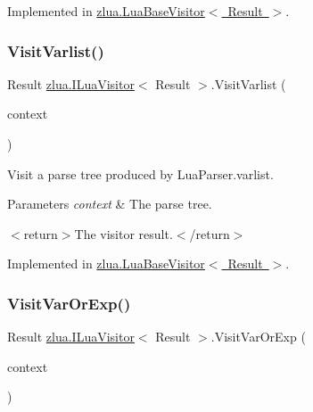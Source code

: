 Implemented in \mbox{\hyperlink{classzlua_1_1_lua_base_visitor_afdd236b54f45e1667274018d2ace456d}{zlua.\+Lua\+Base\+Visitor$<$ Result $>$}}.

\mbox{\label{interfacezlua_1_1_i_lua_visitor_aadf416d9a85416107f278f794421819e}} 
\subsubsection{\texorpdfstring{Visit\+Varlist()}{VisitVarlist()}}
{\footnotesize\ttfamily Result \mbox{\hyperlink{interfacezlua_1_1_i_lua_visitor}{zlua.\+I\+Lua\+Visitor}}$<$ Result $>$.Visit\+Varlist (\begin{DoxyParamCaption}\item[{\mbox{[}\+Not\+Null\mbox{]} \mbox{\hyperlink{classzlua_1_1_lua_parser_1_1_varlist_context}{Lua\+Parser.\+Varlist\+Context}}}]{context }\end{DoxyParamCaption})}



Visit a parse tree produced by Lua\+Parser.\+varlist. 


\begin{DoxyParams}{Parameters}
{\em context} & The parse tree.\\
\hline
\end{DoxyParams}
$<$return$>$The visitor result.$<$/return$>$ 

Implemented in \mbox{\hyperlink{classzlua_1_1_lua_base_visitor_a0afd36a66f579f1e86113881d8e8c78e}{zlua.\+Lua\+Base\+Visitor$<$ Result $>$}}.

\mbox{\label{interfacezlua_1_1_i_lua_visitor_a5b0f7be633f04468e77f13dc194c2511}} 
\subsubsection{\texorpdfstring{Visit\+Var\+Or\+Exp()}{VisitVarOrExp()}}
{\footnotesize\ttfamily Result \mbox{\hyperlink{interfacezlua_1_1_i_lua_visitor}{zlua.\+I\+Lua\+Visitor}}$<$ Result $>$.Visit\+Var\+Or\+Exp (\begin{DoxyParamCaption}\item[{\mbox{[}\+Not\+Null\mbox{]} \mbox{\hyperlink{classzlua_1_1_lua_parser_1_1_var_or_exp_context}{Lua\+Parser.\+Var\+Or\+Exp\+Context}}}]{context }\end{DoxyParamCaption})}



